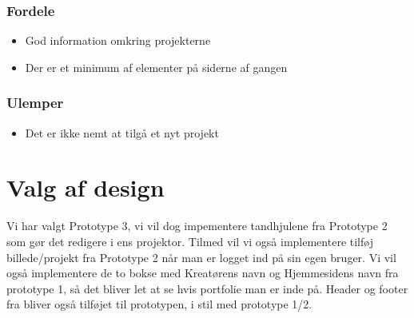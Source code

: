 \documentclass[a4paper,titlepage,fleqn,12pt]{article}
\begin{document}
\subsubsection{Fordele}
\begin{itemize}
	\item God information omkring projekterne
	\item Der er et minimum af elementer på siderne af gangen
\end{itemize}

\subsubsection{Ulemper}
\begin{itemize}
	\item Det er ikke nemt at tilgå et nyt projekt
\end{itemize}

\section{Valg af design}

Vi har valgt Prototype 3, vi vil dog impementere tandhjulene fra Prototype 2 som gør det redigere i ens projektor. Tilmed vil vi også implementere tilføj billede/projekt fra Prototype 2 når man er logget ind på sin egen bruger. Vi vil også implementere de to bokse med Kreatørens navn og Hjemmesidens navn fra prototype 1, så det bliver let at se hvis portfolie man er inde på. Header og footer fra bliver også tilføjet til prototypen, i stil med prototype 1/2.
\end{document}
